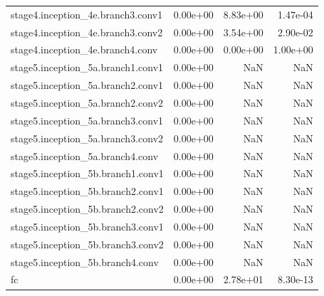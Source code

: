 \begin{longtable}{lrrr}
stage4.inception_4e.branch3.conv1 & 0.00e+00 & 8.83e+00 & 1.47e-04 \\
stage4.inception_4e.branch3.conv2 & 0.00e+00 & 3.54e+00 & 2.90e-02 \\
stage4.inception_4e.branch4.conv & 0.00e+00 & 0.00e+00 & 1.00e+00 \\
stage5.inception_5a.branch1.conv1 & 0.00e+00 & NaN & NaN \\
stage5.inception_5a.branch2.conv1 & 0.00e+00 & NaN & NaN \\
stage5.inception_5a.branch2.conv2 & 0.00e+00 & NaN & NaN \\
stage5.inception_5a.branch3.conv1 & 0.00e+00 & NaN & NaN \\
stage5.inception_5a.branch3.conv2 & 0.00e+00 & NaN & NaN \\
stage5.inception_5a.branch4.conv & 0.00e+00 & NaN & NaN \\
stage5.inception_5b.branch1.conv1 & 0.00e+00 & NaN & NaN \\
stage5.inception_5b.branch2.conv1 & 0.00e+00 & NaN & NaN \\
stage5.inception_5b.branch2.conv2 & 0.00e+00 & NaN & NaN \\
stage5.inception_5b.branch3.conv1 & 0.00e+00 & NaN & NaN \\
stage5.inception_5b.branch3.conv2 & 0.00e+00 & NaN & NaN \\
stage5.inception_5b.branch4.conv & 0.00e+00 & NaN & NaN \\
fc & 0.00e+00 & 2.78e+01 & 8.30e-13 \\
\end{longtable}
